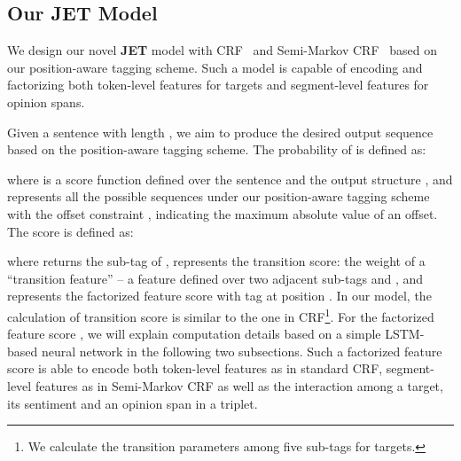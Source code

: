 \documentclass[11pt,a4paper]{article}
\begin{document}
			






			
						













			
			



\subsection{Our JET Model}



We design our novel \textbf{JET} model with CRF~\cite{lafferty2001conditional} and Semi-Markov CRF~\cite{sarawagi2004semi} based on our position-aware tagging scheme.
Such a model is capable of encoding and factorizing both token-level features for targets and segment-level features for opinion spans.


Given a sentence  with length , we aim to produce the desired output sequence  based on the  position-aware  tagging scheme.
The probability of  is defined as:
\setlength{\abovedisplayskip}{4pt} \setlength{\abovedisplayshortskip}{4pt}
\setlength{\belowdisplayskip}{4pt} \setlength{\belowdisplayshortskip}{4pt}

where  is a score function defined over the sentence  and the output structure , and  represents all the possible sequences under our position-aware tagging scheme with the offset constraint , indicating the maximum absolute value of an offset.
The score  is defined as:
\setlength{\abovedisplayskip}{4pt} \setlength{\abovedisplayshortskip}{4pt}
\setlength{\belowdisplayskip}{4pt} \setlength{\belowdisplayshortskip}{4pt}

where  returns the sub-tag of ,  represents the transition score: the weight of a ``transition feature'' -- a feature defined over two adjacent sub-tags  and , and  represents the factorized feature score with tag  at position .
In our model, the calculation of transition score  is similar to the one in CRF\footnote{We calculate the transition parameters among five sub-tags  for targets.}.
{\color{black}For the factorized feature score , we will explain computation details based on a simple LSTM-based neural network in the following two subsections. }
Such a factorized feature score is able to encode both token-level features as in standard CRF, segment-level features as in Semi-Markov CRF as well as the interaction among a target, its sentiment and an opinion span in a triplet.
\end{document}
